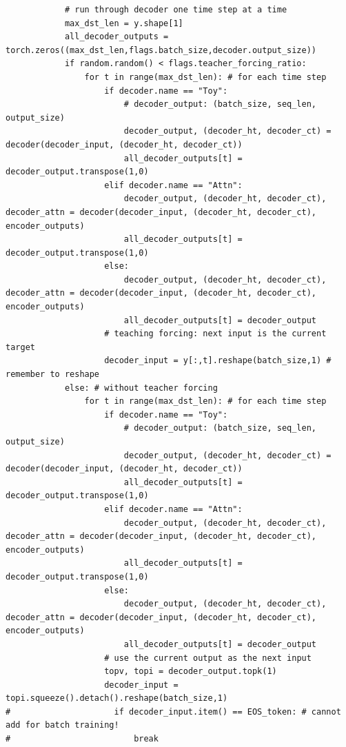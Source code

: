 \documentclass[logo,reportComp]{thesis}
\begin{document}
\begin{lstlisting}
            # run through decoder one time step at a time
            max_dst_len = y.shape[1]
            all_decoder_outputs = torch.zeros((max_dst_len,flags.batch_size,decoder.output_size))
            if random.random() < flags.teacher_forcing_ratio:
                for t in range(max_dst_len): # for each time step
                    if decoder.name == "Toy":
                        # decoder_output: (batch_size, seq_len, output_size)
                        decoder_output, (decoder_ht, decoder_ct) = decoder(decoder_input, (decoder_ht, decoder_ct))
                        all_decoder_outputs[t] = decoder_output.transpose(1,0)
                    elif decoder.name == "Attn":
                        decoder_output, (decoder_ht, decoder_ct), decoder_attn = decoder(decoder_input, (decoder_ht, decoder_ct), encoder_outputs)
                        all_decoder_outputs[t] = decoder_output.transpose(1,0)
                    else:
                        decoder_output, (decoder_ht, decoder_ct), decoder_attn = decoder(decoder_input, (decoder_ht, decoder_ct), encoder_outputs)
                        all_decoder_outputs[t] = decoder_output
                    # teaching forcing: next input is the current target
                    decoder_input = y[:,t].reshape(batch_size,1) # remember to reshape
            else: # without teacher forcing
                for t in range(max_dst_len): # for each time step
                    if decoder.name == "Toy":
                        # decoder_output: (batch_size, seq_len, output_size)
                        decoder_output, (decoder_ht, decoder_ct) = decoder(decoder_input, (decoder_ht, decoder_ct))
                        all_decoder_outputs[t] = decoder_output.transpose(1,0)
                    elif decoder.name == "Attn":
                        decoder_output, (decoder_ht, decoder_ct), decoder_attn = decoder(decoder_input, (decoder_ht, decoder_ct), encoder_outputs)
                        all_decoder_outputs[t] = decoder_output.transpose(1,0)
                    else:
                        decoder_output, (decoder_ht, decoder_ct), decoder_attn = decoder(decoder_input, (decoder_ht, decoder_ct), encoder_outputs)
                        all_decoder_outputs[t] = decoder_output
                    # use the current output as the next input
                    topv, topi = decoder_output.topk(1)
                    decoder_input = topi.squeeze().detach().reshape(batch_size,1)
#                     if decoder_input.item() == EOS_token: # cannot add for batch training!
#                         break


\end{lstlisting}
\end{document}
